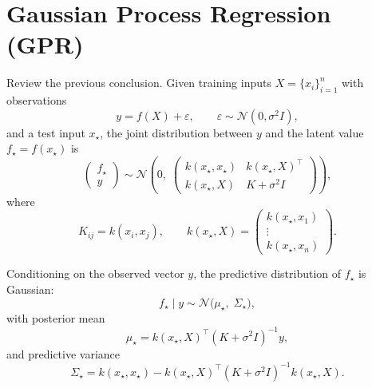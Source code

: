 \documentclass[../main]{subfiles}
\begin{document}
\section{Gaussian Process Regression (GPR)}
Review the previous conclusion. Given training inputs $X=\{x_i\}_{i=1}^n$ with observations
\begin{equation}
    y = f(X) + \varepsilon,\qquad 
    \varepsilon \sim \mathcal N(0,\sigma^2 I),
\end{equation}
and a test input $x_\star$, the joint distribution between $y$ and the
latent value $f_\star = f(x_\star)$ is
\begin{equation}
    \begin{pmatrix}
        f_\star \\[4pt]
        y
    \end{pmatrix}
    \sim
    \mathcal N\!\left(
        0,\;
        \begin{pmatrix}
            k(x_\star,x_\star) & k(x_\star,X)^\top \\[4pt]
            k(x_\star,X)       & K + \sigma^2 I
        \end{pmatrix}
    \right),
\end{equation}
where
\begin{equation}
    K_{ij} = k(x_i,x_j),\qquad
    k(x_\star,X)
    =
    \begin{pmatrix}
        k(x_\star,x_1)\\
        \vdots\\
        k(x_\star,x_n)
    \end{pmatrix}.
\end{equation}

Conditioning on the observed vector $y$, the predictive distribution of
$f_\star$ is Gaussian:
\begin{equation}
    f_\star \mid y
    \sim
    \mathcal N\!\bigl(
        \mu_\star,\;
        \Sigma_\star
    \bigr),
\end{equation}
with posterior mean
\begin{equation}
    \mu_\star
    = k(x_\star,X)^\top (K + \sigma^2 I)^{-1} y,
\end{equation}
and predictive variance
\begin{equation}
    \Sigma_\star
    = k(x_\star,x_\star)
      - k(x_\star,X)^\top (K + \sigma^2 I)^{-1} k(x_\star,X).
\end{equation}
\end{document}
